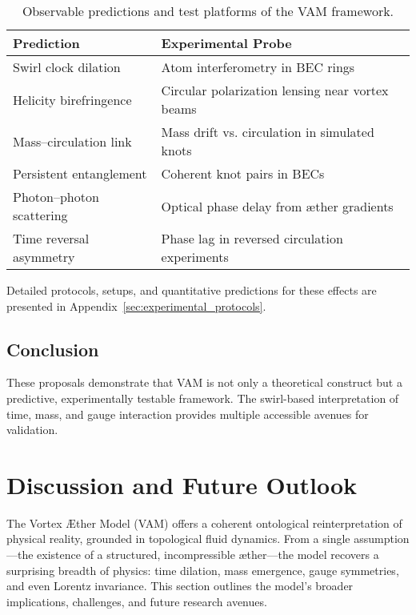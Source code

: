 \documentclass[12pt]{article}
\begin{document}
    \begin{table}[H]
        \centering
        \begin{tabular}{|l|p{9cm}|}
            \hline
            \textbf{Prediction} & \textbf{Experimental Probe} \\
            \hline
            Swirl clock dilation & Atom interferometry in BEC rings \\
            Helicity birefringence & Circular polarization lensing near vortex beams \\
            Mass–circulation link & Mass drift vs. circulation in simulated knots \\
            Persistent entanglement & Coherent knot pairs in BECs \\
            Photon–photon scattering & Optical phase delay from æther gradients \\
            Time reversal asymmetry & Phase lag in reversed circulation experiments \\
            \hline
        \end{tabular}
        \caption{Observable predictions and test platforms of the VAM framework.}
        \label{tab:observable_tests}
    \end{table}
    Detailed protocols, setups, and quantitative predictions for these effects are presented in Appendix~\ref{sec:experimental_protocols}.

    \subsection{Conclusion}
    These proposals demonstrate that VAM is not only a theoretical construct but a predictive, experimentally testable framework. The swirl-based interpretation of time, mass, and gauge interaction provides multiple accessible avenues for validation.


\section{Discussion and Future Outlook}
    The Vortex \AE{}ther Model (VAM) offers a coherent ontological reinterpretation of physical reality, grounded in topological fluid dynamics. From a single assumption—the existence of a structured, incompressible æther—the model recovers a surprising breadth of physics: time dilation, mass emergence, gauge symmetries, and even Lorentz invariance. This section outlines the model’s broader implications, challenges, and future research avenues.
\end{document}
